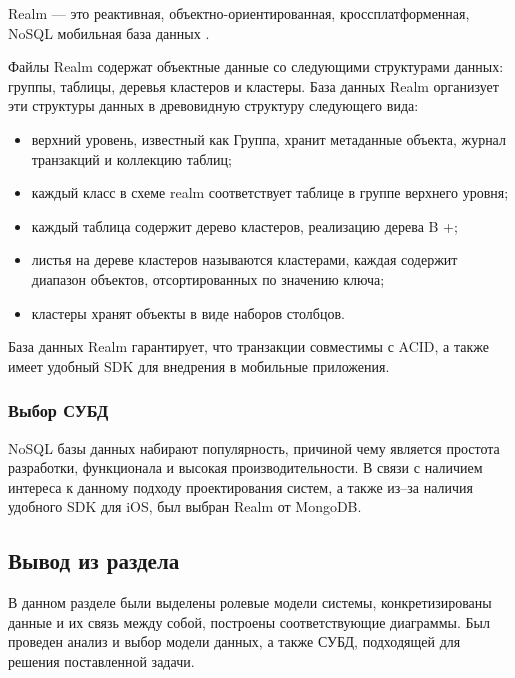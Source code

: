 Realm --- это реактивная, объектно-ориентированная, кроссплатформенная, NoSQL мобильная база данных \cite{realm}. 

Файлы Realm содержат объектные данные со следующими структурами данных: группы, таблицы, деревья кластеров и кластеры. База данных Realm организует эти структуры данных в древовидную структуру следующего вида:

\begin{itemize}[label=---]
	\item верхний уровень, известный как Группа, хранит метаданные объекта, журнал транзакций и коллекцию таблиц;
	\item каждый класс в схеме realm соответствует таблице в группе верхнего уровня;
	\item каждый таблица содержит дерево кластеров, реализацию дерева B +;
	\item листья на дереве кластеров называются кластерами, каждая содержит диапазон объектов, отсортированных по значению ключа;
	\item кластеры хранят объекты в виде наборов столбцов.
\end{itemize}

База данных Realm гарантирует, что транзакции совместимы с ACID, а также имеет удобный SDK для внедрения в мобильные приложения.

\subsubsection{Выбор СУБД}

NoSQL базы данных набирают популярность, причиной чему является простота разработки, функционала и высокая производительности. В связи с наличием интереса к данному подходу проектирования систем, а также из--за наличия удобного SDK для iOS, был выбран Realm от MongoDB.

\subsection{Вывод из раздела}

В данном разделе были выделены ролевые модели системы, конкретизированы данные и их связь между собой, построены соответствующие диаграммы. Был проведен анализ и выбор модели данных, а также СУБД, подходящей для решения поставленной задачи. 

